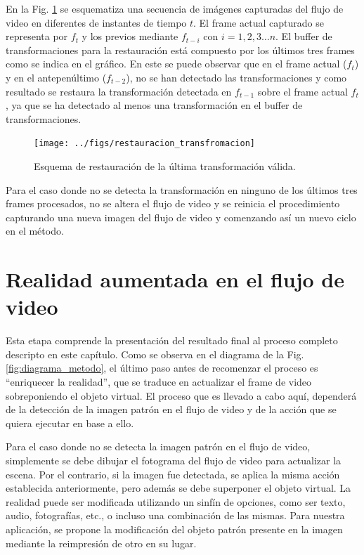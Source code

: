 En la Fig. \ref{fig:restauracion_transformacion} se esquematiza una secuencia de imágenes capturadas del flujo de video en diferentes de instantes de tiempo $t$. El frame actual capturado se representa por $f_t$ y los previos mediante $f_{t-i}$ con $i=1,2,3 \ldots n$. El buffer de transformaciones para la restauración está compuesto por los últimos tres frames como se indica en el gráfico. En este se puede observar que en el frame actual ($f_t$) y en el antepenúltimo ($f_{t-2}$), no se han detectado las transformaciones y como resultado se restaura la transformación detectada en $f_{t-1}$ sobre el frame actual $f_{t}$, ya que se ha detectado al menos una transformación en el buffer de transformaciones.
\begin{figure}[tbhp]
   \centering
        \texttt{[image: ../figs/restauracion\_transfromacion]}
    \caption[Esquema de restauración de la última transformación válida]{Esquema de restauración de la última transformación válida.}
   \label{fig:restauracion_transformacion} 
\end{figure}

Para el caso donde no se detecta la transformación en ninguno de los últimos tres frames procesados, no se altera el flujo de video y se reinicia el procedimiento capturando una nueva imagen del flujo de video y comenzando así un nuevo ciclo en el método.
\section{Realidad aumentada en el flujo de video}
Esta etapa comprende la presentación del resultado final al proceso completo descripto en este capítulo. Como se observa en el diagrama de la Fig. \ref{fig:diagrama_metodo}, el último paso antes de recomenzar el proceso es ``enriquecer la realidad'', que se traduce en actualizar el frame de video sobreponiendo el objeto virtual. El proceso que es llevado a cabo aquí, dependerá de la detección de la imagen patrón en el flujo de video y de la acción que se quiera ejecutar en base a ello.

Para el caso donde no se detecta la imagen patrón en el flujo de video, simplemente se debe dibujar el fotograma del flujo de video para actualizar la escena. Por el contrario, si la imagen fue detectada, se aplica la misma acción establecida anteriormente, pero además se debe superponer el objeto virtual. 
La realidad puede ser modificada utilizando un sinfín de opciones, como ser texto, audio, fotografías, etc., o incluso una combinación de las mismas. Para nuestra aplicación, se propone la modificación del objeto patrón presente en la imagen mediante la reimpresión de otro en su lugar.

